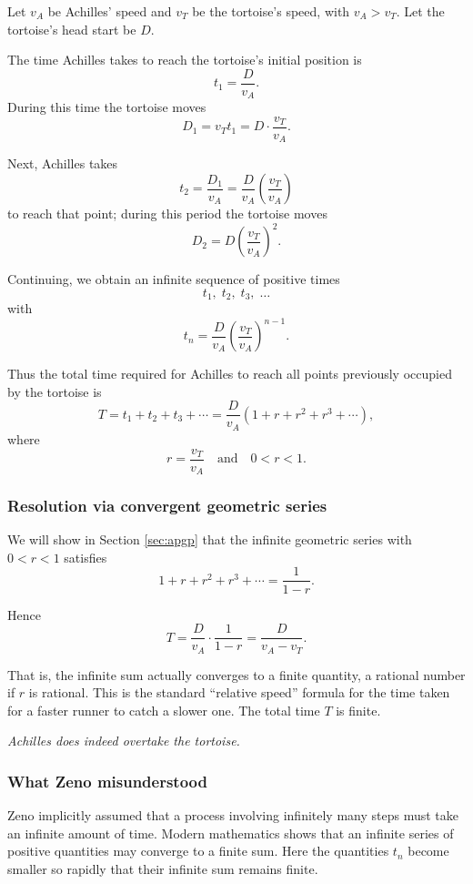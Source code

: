 Let $v_A$ be Achilles' speed and $v_T$ be the tortoise's speed, with
$v_A > v_T$.  Let the tortoise's head start be $D$.

The time Achilles takes to reach the tortoise's initial position is
\[
t_1 = \frac{D}{v_A}.
\]
During this time the tortoise moves
\[
D_1 = v_T t_1 = D\cdot \frac{v_T}{v_A}.
\]

Next, Achilles takes
\[
t_2 = \frac{D_1}{v_A} = \frac{D}{v_A}\left(\frac{v_T}{v_A}\right)
\]
to reach that point; during this period the tortoise moves
\[
D_2 = D \left(\frac{v_T}{v_A}\right)^2.
\]

Continuing, we obtain an infinite sequence of positive times
\[
t_1, \; t_2, \; t_3,\; \dots
\]
with
\[
t_n = \frac{D}{v_A}\left(\frac{v_T}{v_A}\right)^{n-1}.
\]

Thus the total time required for Achilles to reach all points previously
occupied by the tortoise is
\[
T = t_1 + t_2 + t_3 + \cdots
 = \frac{D}{v_A}
   \left(1 + r + r^2 + r^3 + \cdots\right),
\]
where
\[
r = \frac{v_T}{v_A} \quad \text{and} \quad 0 < r < 1.
\]

\subsubsection*{Resolution via convergent geometric series}

We will show in Section \ref{sec:apgp} that the  infinite geometric series with $0 < r < 1$ satisfies
\[
1 + r + r^2 + r^3 + \cdots = \frac{1}{1-r}.
\]

Hence
\[
T
 = \frac{D}{v_A}\cdot \frac{1}{1-r}
 = \frac{D}{v_A - v_T}.
\]

That is, the infinite sum actually converges to a finite quantity, a rational number if $r$ is rational. This is the standard ``relative speed'' formula for the time taken for a
faster runner to catch a slower one.  The total time $T$ is finite.

\emph{Achilles does indeed overtake the tortoise.}

\subsubsection*{What Zeno misunderstood}

Zeno implicitly assumed that a process involving infinitely many steps
must take an infinite amount of time.  Modern mathematics shows that
an infinite series of positive quantities may converge to a finite sum.
Here the quantities $t_n$ become smaller so rapidly that their infinite
sum remains finite.

